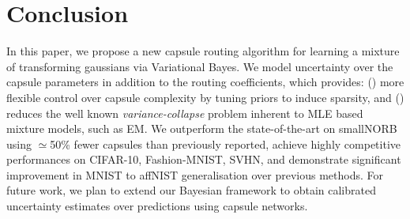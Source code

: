 \documentclass[letterpaper]{article} \usepackage{aaai20}  \usepackage{times}  \usepackage{helvet} \usepackage{courier}  \usepackage[hyphens]{url}  \usepackage{graphicx} \urlstyle{rm} \def\UrlFont{\rm}  \usepackage{graphicx}  \frenchspacing  \setlength{\pdfpagewidth}{8.5in}  \setlength{\pdfpageheight}{11in}  \nocopyright
\newcommand{\lowerromannumeral}[1]{\romannumeral#1\relax}
\begin{document}
\section{Conclusion}
In this paper, we propose a new capsule routing algorithm for learning a mixture of transforming gaussians via Variational Bayes. We model uncertainty over the capsule parameters in addition to the routing coefficients, which provides: (\lowerromannumeral{1}) more flexible control over capsule complexity by tuning priors to induce sparsity, and (\lowerromannumeral{2}) reduces the well known \textit{variance-collapse} problem inherent to MLE based mixture models, such as EM. We outperform the state-of-the-art on smallNORB using $\simeq$50\% fewer capsules than previously reported, achieve highly competitive performances on CIFAR-10, Fashion-MNIST, SVHN, and demonstrate significant improvement in MNIST to affNIST generalisation over previous methods. For future work, we plan to extend our Bayesian framework to obtain calibrated uncertainty estimates over predictions using capsule networks.
{\fontsize{9.0pt}{10.0pt}\selectfont
}

\end{document}
